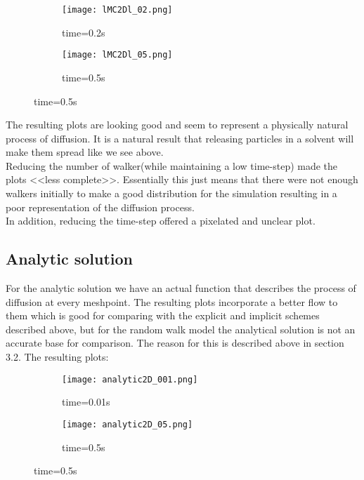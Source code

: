 \documentclass[a4paper,11pt]{article}
\begin{document}
    \begin{figure}[H]
        \caption{Randomwalk two dimensions $10^6$ walkers $\Delta t=0.0005$}
        \captionsetup[subfigure]{labelformat=empty}
        \begin{subfigure}[b!]{0.55\textwidth}
            \texttt{[image: lMC2Dl\_02.png]}
            \caption{time=0.2s}
        \end{subfigure}
        \begin{subfigure}[b!]{0.55\textwidth}
            \texttt{[image: lMC2Dl\_05.png]}
            \caption{time=0.5s}
        \end{subfigure}
    \end{figure} \justify

    The resulting plots are looking good and seem to represent a physically natural process of diffusion. It is a natural result that releasing particles in a solvent will make them spread like we see above.\\
    Reducing the number of walker(while maintaining a low time-step) made the plots <<less complete>>. Essentially this just means that there were not enough walkers initially to make a good distribution for the simulation resulting in a poor representation of the diffusion process.\\
    In addition, reducing the time-step offered a pixelated and unclear plot.

\subsection{Analytic solution}
    For the analytic solution we have an actual function that describes the process of diffusion at every meshpoint. The resulting plots incorporate a better flow to them which is good for comparing with the explicit and implicit schemes described above, but for the random walk model the analytical solution is not an accurate base for comparison. The reason for this is described above in section 3.2. The resulting plots:
    \begin{figure}[H]
        \caption{Analytical two dimensions}
        \captionsetup[subfigure]{labelformat=empty}
        \begin{subfigure}[b!]{0.55\textwidth}
            \texttt{[image: analytic2D\_001.png]}
            \caption{time=0.01s}
        \end{subfigure}
        \begin{subfigure}[b!]{0.55\textwidth}
            \texttt{[image: analytic2D\_05.png]}
            \caption{time=0.5s}
        \end{subfigure}
    \end{figure}
    
\end{document}

